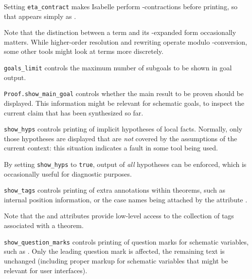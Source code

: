 \begin{isabellebody}
\begin{isamarkuptext}
\begin{description}
  Setting \verb|eta_contract| makes Isabelle perform \isa{{\isasymeta}}-contractions before printing, so that 
  appears simply as .

  Note that the distinction between a term and its \isa{{\isasymeta}}-expanded
  form occasionally matters.  While higher-order resolution and
  rewriting operate modulo \isa{{\isachardoublequote}{\isasymalpha}{\isasymbeta}{\isasymeta}{\isachardoublequote}}-conversion, some other tools
  might look at terms more discretely.

  \item \verb|goals_limit| controls the maximum number of subgoals to
  be shown in goal output.

  \item \verb|Proof.show_main_goal| controls whether the main result to
  be proven should be displayed.  This information might be relevant
  for schematic goals, to inspect the current claim that has been
  synthesized so far.

  \item \verb|show_hyps| controls printing of implicit hypotheses of
  local facts.  Normally, only those hypotheses are displayed that are
  \emph{not} covered by the assumptions of the current context: this
  situation indicates a fault in some tool being used.

  By setting \verb|show_hyps| to \verb|true|, output of \emph{all}
  hypotheses can be enforced, which is occasionally useful for
  diagnostic purposes.

  \item \verb|show_tags| controls printing of extra annotations within
  theorems, such as internal position information, or the case names
  being attached by the attribute \hyperlink{attribute.case-names}{\mbox{}}.

  Note that the \hyperlink{attribute.tagged}{\mbox{}} and \hyperlink{attribute.untagged}{\mbox{}}
  attributes provide low-level access to the collection of tags
  associated with a theorem.

  \item \verb|show_question_marks| controls printing of question marks
  for schematic variables, such as .  Only the leading
  question mark is affected, the remaining text is unchanged
  (including proper markup for schematic variables that might be
  relevant for user interfaces).


\end{description}
\end{isamarkuptext}
\end{isabellebody}
